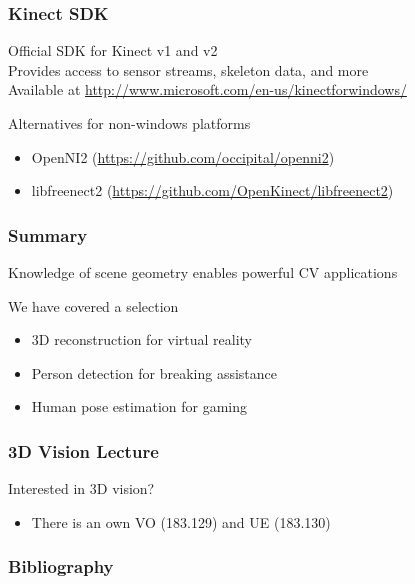 \documentclass[xetex,professionalfont]{beamer}
\begin{document}

\begin{frame}
\frametitle{Kinect SDK}

Official SDK for Kinect v1 and v2 \\\medskip
Provides access to sensor streams, skeleton data, and more\\\medskip
Available at \url{http://www.microsoft.com/en-us/kinectforwindows/}

\bigskip
Alternatives for non-windows platforms
\begin{itemize}
    \item OpenNI2 (\url{https://github.com/occipital/openni2}) %
    \item libfreenect2 (\url{https://github.com/OpenKinect/libfreenect2}) %
\end{itemize}

\end{frame}


\begin{frame}
\frametitle{Summary}

Knowledge of scene geometry enables powerful CV applications

\bigskip
We have covered a selection
\begin{itemize}
    \item 3D reconstruction for virtual reality
    \item Person detection for breaking assistance
    \item Human pose estimation for gaming
\end{itemize}

\end{frame}


\begin{frame}
\frametitle{3D Vision Lecture}

Interested in 3D vision?
\begin{itemize}
    \item There is an own VO (183.129) and UE (183.130)
\end{itemize}

\end{frame}


\begin{frame}[allowframebreaks=0.8]
\frametitle{Bibliography}

\printbibliography

\end{frame}
\end{document}
